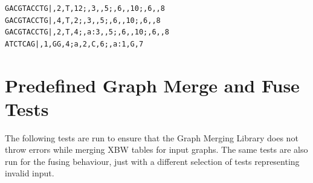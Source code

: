 \documentclass[a4paper,12pt,twoside,BCOR=10mm]{scrbook}
\begin{document}
\begin{lstlisting}
GACGTACCTG|,2,T,12;,3,,5;,6,,10;,6,,8
GACGTACCTG|,4,T,2;,3,,5;,6,,10;,6,,8
GACGTACCTG|,2,T,4;,a:3,,5;,6,,10;,6,,8
ATCTCAG|,1,GG,4;a,2,C,6;,a:1,G,7
\end{lstlisting}

\section{Predefined Graph Merge and Fuse Tests}
\label{sec:appendix_graph_merge_tests}
%


The following tests are run to ensure that the Graph Merging Library does not throw errors
while merging XBW tables for input graphs. The same tests are also run for the fusing
behaviour, just with a different selection of tests representing invalid input.
\end{document}
